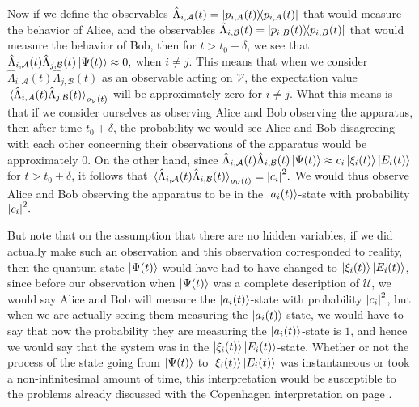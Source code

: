 \documentclass[letter, 12pt]{turabian-thesis}
\theoremstyle{hypothesis}
\begin{document}
Now if we define the observables $\hat{\Lambda}_{i,\mathcal{A}}(t)=\dyad{p_{i,A}(t)}$ that would measure the behavior of Alice, and the observables $\hat{\Lambda}_{i,\mathcal{B}}(t)=\dyad{p_{i,B}(t)}$ that would measure the behavior of Bob, then for $t>t_0+\delta$, we see that $\hat{\Lambda}_{i,\mathcal{A}}(t)\hat{\Lambda}_{j,\mathcal{B}}(t)\ket{\Psi(t)}\approx 0,$ when $i\neq j$. This means that when we consider $\hat{\Lambda}_{i,\mathcal{A}}(t)\hat{\Lambda}_{j,\mathcal{B}}(t)$ as an observable acting on $\mathcal{V}$,  the expectation value $\ev*{\hat{\Lambda}_{i,\mathcal{A}}(t)\hat{\Lambda}_{j,\mathcal{B}}(t)}_{\rho_\mathcal{V}(t)}$ will be approximately zero for $i\neq j$. What this means is that if we consider ourselves as observing Alice and Bob observing the apparatus, then after time $t_0+\delta$, the probability we would see Alice and Bob disagreeing with each other concerning their observations of the apparatus would be approximately 0. 
 On the other hand, since $\hat{\Lambda}_{i,\mathcal{A}}(t)\hat{\Lambda}_{i,\mathcal{B}}(t)\ket{\Psi(t)} \approx c_i \ket{\xi_i(t)}\ket{E_i(t)}$ for $t>t_0+\delta$, it follows that $\ev*{\hat{\Lambda}_{i,\mathcal{A}}(t)\hat{\Lambda}_{i,\mathcal{B}}(t)}_{\rho_\mathcal{V}(t)}=\abs{c_i}^2.$ 
 We would thus observe Alice and Bob observing the apparatus to be in the $\ket{a_i(t)}$-state with probability $\abs{c_i}^2.$ 
 
 But note that on the assumption that there are no hidden variables, if we did actually make such an observation and this observation corresponded to reality, then the quantum state $\ket{\Psi(t)}$ would have had to have changed to $\ket{\xi_i(t)}\ket{E_i(t)}$, since before our observation when $\ket{\Psi(t)}$ was a complete description of $\mathcal{U}$, we would say Alice and Bob will measure the $\ket{a_i(t)}$-state with probability $\abs{c_i}^2$, but when we are actually seeing them measuring the $\ket{a_i(t)}$-state, we would have to say that now the probability they are measuring the $\ket{a_i(t)}$-state is $1$, and hence we would say that the system was in the $\ket{\xi_i(t)}\ket{E_i(t)}$-state. Whether or not the process of the state going from $\ket{\Psi(t)}$ to $\ket{\xi_i(t)}\ket{E_i(t)}$ was instantaneous or took a non-infinitesimal amount of time, this interpretation would be susceptible to the problems already discussed with the Copenhagen interpretation on page \pageref{Copenhagenproblem}.
\end{document}
